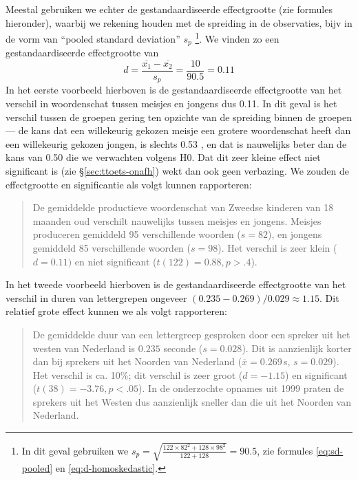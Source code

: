 \documentclass[
]{book}
\begin{document}
Meestal gebruiken we echter de gestandaardiseerde effectgrootte (zie
formules hieronder), waarbij we rekening houden met de spreiding in de
observaties, bijv in de vorm van ``pooled standard deviation'' \(s_p\) \footnote{In dit geval gebruiken we \(s_p = \sqrt{ \frac{122\times82^2+128\times98^2} {122+128} } = 90.5\), zie formules \eqref{eq:sd-pooled} en \eqref{eq:d-homoskedastic}.}.
We vinden zo een gestandaardiseerde effectgrootte van
\begin{equation}
  \label{eq:d-standardized}
    d = \frac{ \overline{x_1}-\overline{x_2} } {s_p} = \frac{10}{90.5} = 0.11
\end{equation}
In het eerste voorbeeld hierboven is de gestandaardiseerde effectgrootte
van het verschil in woordenschat tussen meisjes en jongens dus 0.11. In
dit geval is het verschil tussen de groepen gering ten opzichte van de
spreiding binnen de groepen --- de kans dat een willekeurig gekozen
meisje een grotere woordenschat heeft dan een willekeurig gekozen
jongen, is slechts 0.53 \citep{McGraw92}, en dat is nauwelijks beter dan de
kans van 0.50 die we verwachten volgens H0. Dat dit zeer kleine effect
niet significant is (zie §\ref{sec:ttoets-onafh}) wekt dan ook geen verbazing.
We zouden de
effectgrootte en significantie als volgt kunnen rapporteren:

\begin{quote}
De gemiddelde productieve woordenschat van Zweedse kinderen van 18
maanden oud verschilt nauwelijks tussen meisjes en jongens. Meisjes
produceren gemiddeld 95 verschillende woorden (\(s=82\)), en jongens
gemiddeld 85 verschillende woorden (\(s=98\)). Het verschil is zeer
klein (\(d=0.11)\) en niet significant (\(t(122)=0.88, p>.4\)).
\end{quote}

In het tweede voorbeeld hierboven is de gestandaardiseerde effectgrootte
van het verschil in duren van lettergrepen ongeveer
\((0.235-0.269)/0.029 \approx 1.15\). Dit relatief grote effect kunnen we
als volgt rapporteren:

\begin{quote}
De gemiddelde duur van een lettergreep gesproken door een spreker uit
het westen van Nederland is \(0.235\) seconde (\(s=0.028\)). Dit is
aanzienlijk korter dan bij sprekers uit het Noorden van Nederland
(\(\overline{x}=0.269\) s, \(s=0.029\)). Het verschil is ca. 10\%; dit
verschil is zeer groot (\(d=-1.15\)) en significant
(\(t(38)=-3.76, p<.05\)). In de onderzochte opnames uit 1999 praten de
sprekers uit het Westen dus aanzienlijk sneller dan die uit het
Noorden van Nederland.
\end{quote}
\end{document}

